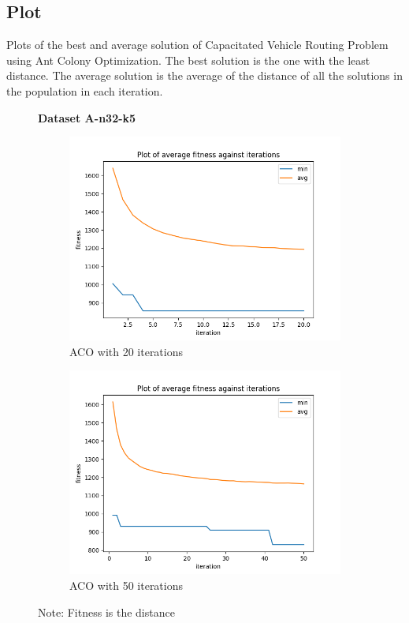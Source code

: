 \documentclass{article}
\begin{document}
\subsection{Plot}
Plots of the best and average solution of Capacitated Vehicle Routing Problem using Ant Colony Optimization. The best solution is the one with the least distance. The average solution is the average of the distance of all the solutions in the population in each iteration.
\begin{figure}[H]
  \centering
  \textbf{Dataset A-n32-k5}
  \begin{subfigure}{.5\textwidth}
    \centering
    \includegraphics[width=1\linewidth]{images/n32-k5_20.png}
    \caption{ACO with 20 iterations}
    \label{fig:n32-k5_20}
  \end{subfigure}%
  \begin{subfigure}{.5\textwidth}
    \centering
    \includegraphics[width=1\linewidth]{images/n32-k5_50.png}
    \caption{ACO with 50 iterations}
    \label{fig:n32-k5_50}
  \end{subfigure}
  \caption{Note: Fitness is the distance}
  \label{fig:n32-k5}
\end{figure}
\end{document}
